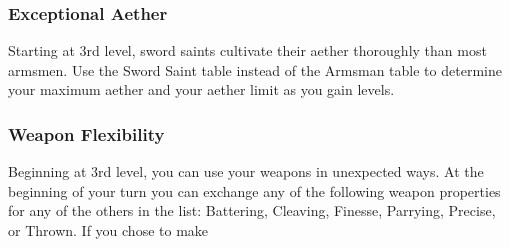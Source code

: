 \subsubsection{Exceptional Aether}
Starting at 3rd level, sword saints cultivate their aether thoroughly than most armsmen. Use the Sword Saint table instead of the Armsman table to determine your maximum aether and your aether limit as you gain levels.

\subsubsection{Weapon Flexibility}
Beginning at 3rd level, you can use your weapons in unexpected ways. At the beginning of your turn you can exchange any of the following weapon properties for any of the others in the list: Battering, Cleaving, Finesse, Parrying, Precise, or Thrown. If you chose to make 